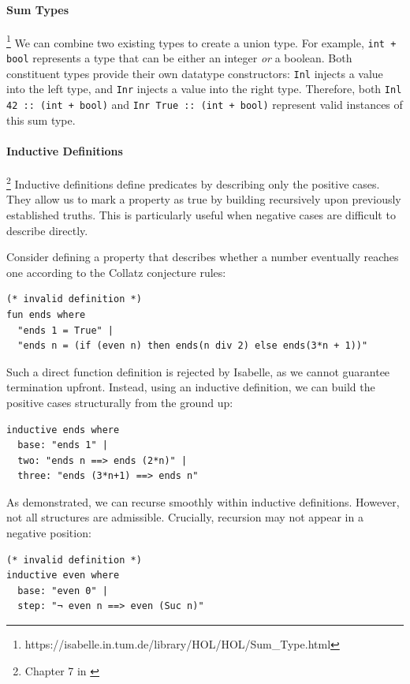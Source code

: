 \documentclass[11pt]{article}
\begin{document}
\paragraph{Sum Types}\footnote{https://isabelle.in.tum.de/library/HOL/HOL/Sum\_Type.html}
We can combine two existing types to create a union type.
For example, \texttt{int + bool} represents a type that can be either an integer \emph{or} a boolean.
Both constituent types provide their own datatype constructors:
\texttt{Inl} injects a value into the left type,
and \texttt{Inr} injects a value into the right type.
Therefore, both \texttt{Inl 42 :: (int + bool)} and \texttt{Inr True :: (int + bool)} represent valid instances of this sum type.

\paragraph{Inductive Definitions}\footnote{Chapter 7 in \cite{nipkow2002isabelle}}
Inductive definitions define predicates by describing only the positive cases.
They allow us to mark a property as true by building recursively upon previously established truths.
This is particularly useful when negative cases are difficult to describe directly.

Consider defining a property that describes whether a number eventually reaches one according to the Collatz conjecture rules:

\begin{verbatim}
(* invalid definition *)
fun ends where
  "ends 1 = True" |
  "ends n = (if (even n) then ends(n div 2) else ends(3*n + 1))"
\end{verbatim}

Such a direct function definition is rejected by Isabelle, as we cannot guarantee termination upfront.
Instead, using an inductive definition, we can build the positive cases structurally from the ground up:

\begin{verbatim}
inductive ends where
  base: "ends 1" |
  two: "ends n ==> ends (2*n)" |
  three: "ends (3*n+1) ==> ends n"
\end{verbatim}

As demonstrated, we can recurse smoothly within inductive definitions.
However, not all structures are admissible.
Crucially, recursion may not appear in a negative position:

\begin{verbatim}
(* invalid definition *)
inductive even where
  base: "even 0" |
  step: "¬ even n ==> even (Suc n)"
\end{verbatim}
\end{document}
